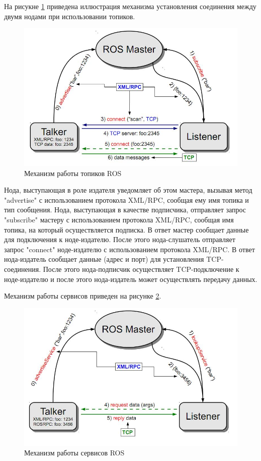 На рисукне \ref{img:ros_topic_mechainism} приведена иллюстрация механизма установления соединения между двумя нодами
при использовании топиков.

\begin{figure}[h]
    \centering
    \includegraphics[width=0.8\linewidth]{images/3_devel/ros_topic}
    \caption{Механизм работы топиков ROS}
    \label{img:ros_topic_mechainism}
\end{figure}

Нода, выступающая в роле издателя уведомляет об этом мастера, вызывая метод "advertise" с использованием протокола XML/RPC,
сообщая ему имя топика и тип сообщения. Нода, выступающая в качестве подписчика, отправляет запрос "subscribe" мастеру
с использованием протокола XML/RPC, сообщая имя топика, на который осуществляется подписка. В ответ мастер сообщает
данные для подключения к ноде-издателю. После этого нода-слушатель отправляет запрос "connect" ноде-издателю с
использованием протокола XML/RPC. В ответ нода-издатель сообщает данные (адрес и порт) для установления TCP-соединения.
После этого нода-подписчик осуществляет TCP-подключение к ноде-издателю и после этого нода-издатель может осуществлять
передачу данных.

Механизм работы сервисов приведен на рисунке \ref{img:ros_service_mechainism}.

\begin{figure}[h]
    \centering
    \includegraphics[width=0.8\linewidth]{images/3_devel/ros_service}
    \caption{Механизм работы сервисов ROS}
    \label{img:ros_service_mechainism}
\end{figure}

